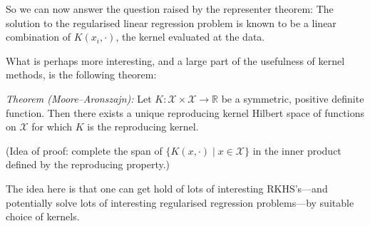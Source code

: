 \documentclass[11pt]{article}
\begin{document}
So we can now answer the question raised by the representer theorem: The
solution to the regularised linear regression problem is known to be a linear
combination of \(K(x_i, \cdot)\), the kernel evaluated at the data.

What is perhaps more interesting, and a large part of the usefulness of kernel
methods, is the following theorem:

\emph{Theorem (Moore--Aronszajn):} Let \(K:\mathcal{X}\times\mathcal{X}\to\mathbb{R}\)
be a symmetric, positive definite function. Then there exists a unique
reproducing kernel Hilbert space of functions on \(\mathcal{X}\) for which \(K\) is
the reproducing kernel.

(Idea of proof: complete the span of \(\{K(x, \cdot) \mid x\in\mathcal{X}\}\) in the
inner product defined by the reproducing property.)

The idea here is that one can get hold of lots of interesting RKHS's---and
potentially solve lots of interesting regularised regression problems---by
suitable choice of kernels. 
\end{document}
